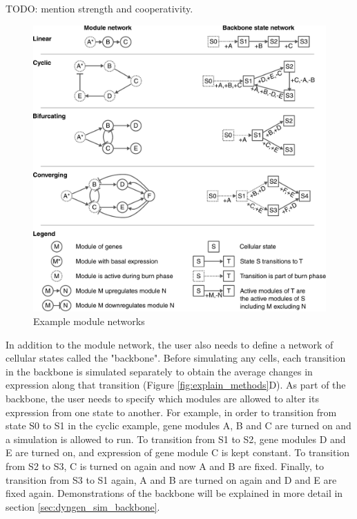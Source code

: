 TODO: mention strength and cooperativity.

\begin{figure}[htb!]
	\centering
	\includegraphics[width=\LARGEfigure]{fig/example_backbones} 
	\caption{Example module networks}
	\label{fig:example_backbones}
\end{figure}

In addition to the module network, the user also needs to define a network of cellular states called the "backbone". Before simulating any cells, each transition in the backbone is simulated separately to obtain the average changes in expression along that transition (Figure \ref{fig:explain_methods}D). As part of the backbone, the user needs to specify which modules are allowed to alter its expression from one state to another. For example, in order to transition from state S0 to S1 in the cyclic example, gene modules A, B and C are turned on and a simulation is allowed to run. To transition from S1 to S2, gene modules D and E are turned on, and expression of gene module C is kept constant. To transition from S2 to S3, C is turned on again and now A and B are fixed. Finally, to transition from S3 to S1 again, A and B are turned on again and D and E are fixed again. Demonstrations of the backbone will be explained in more detail in section \ref{sec:dyngen_sim_backbone}.

